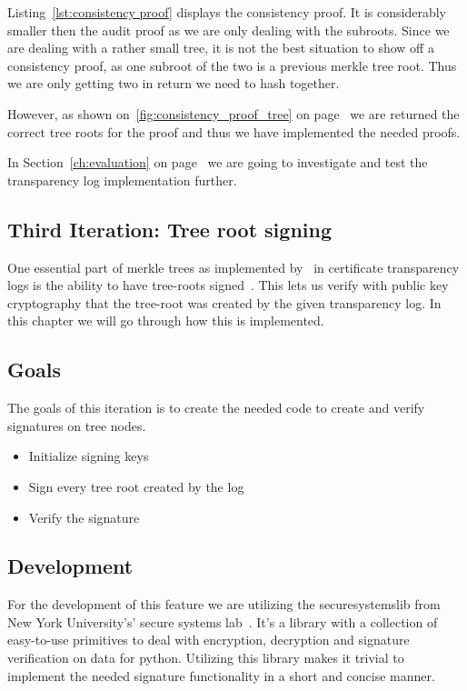\documentclass[../Main/thesis.tex]{subfiles}
\begin{document}
Listing~\ref{lst:consistency proof} displays the consistency proof. It is
considerably smaller then the audit proof as we are only dealing with the
subroots. Since we are dealing with a rather small tree, it is not the best
situation to show off a consistency proof, as one subroot of the two is a
previous merkle tree root. Thus we are only getting two in return we need to
hash together. 

However, as shown on~\ref{fig:consistency_proof_tree} on
page~\pageref{fig:consistency_proof_tree} we are returned the correct tree roots
for the proof and thus we have implemented the needed proofs.

In Section~\ref{ch:evaluation} on page~\pageref{ch:evaluation} we are going to
investigate and test the transparency log implementation further.

\subsection{Third Iteration: Tree root signing}%
\label{sub:tree_root_signing}
One essential part of merkle trees as implemented
by~\citeauthor{b.-laurie-a.-langley-e.kaster-google-2013} in certificate
transparency logs is the ability to have tree-roots
signed~\cite{b.-laurie-a.-langley-e.kaster-google-2013}. This lets us verify
with public key cryptography that the tree-root was created by the given
transparency log. In this chapter we will go through how this is implemented.

\subsection*{Goals}%
\label{sub:third_iteration_goals}

The goals of this iteration is to create the needed code to create and verify
signatures on tree nodes.

\begin{itemize}
    \item Initialize signing keys
    \item Sign every tree root created by the log
    \item Verify the signature
\end{itemize}

\subsection*{Development}%
\label{sub:third_iteration_development}
For the development of this feature we are utilizing the securesystemslib from
New York University's' secure systems lab~\cite{securesystemslib}. It's a
library with a collection of easy-to-use primitives to deal with encryption,
decryption and signature verification on data for python. Utilizing this library
makes it trivial to implement the needed signature functionality in a short and
concise manner.
\end{document}
